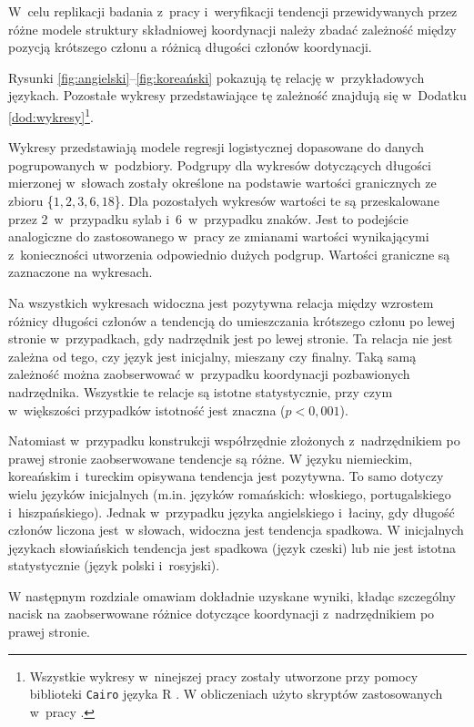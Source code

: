 W~celu replikacji badania z~pracy \cite{przepiorkowski2023conjunct} i~weryfikacji tendencji przewidywanych przez różne modele struktury składniowej koordynacji należy zbadać zależność między pozycją krótszego członu a różnicą długości członów koordynacji.

Rysunki \ref{fig:angielski}--\ref{fig:koreański} pokazują tę relację w~przykładowych językach. Pozostałe wykresy przedstawiające tę zależność znajdują się w~Dodatku \ref{dod:wykresy}\footnote{
Wszystkie wykresy w~ninejszej pracy zostały utworzone przy pomocy biblioteki \texttt{Cairo} języka R \citep{R2023}. W obliczeniach użyto skryptów zastosowanych w~pracy \cite{przepiorkowski2023conjunct}.}.

Wykresy przedstawiają modele regresji logistycznej dopasowane do danych pogrupowanych w~podzbiory. Podgrupy dla wykresów dotyczących długości mierzonej w~słowach zostały określone na podstawie wartości granicznych ze zbioru \{$1, 2, 3, 6, 18$\}. Dla pozostałych wykresów wartości te są przeskalowane przez 2~w~przypadku sylab i~6~w~przypadku znaków. Jest to podejście analogiczne do zastosowanego w~pracy \cite{przepiorkowski2023conjunct} ze zmianami wartości wynikającymi z~konieczności utworzenia odpowiednio dużych podgrup. Wartości graniczne są zaznaczone na wykresach. 

Na wszystkich wykresach widoczna jest pozytywna relacja między wzrostem różnicy długości członów a tendencją do umieszczania krótszego członu po lewej stronie w~przypadkach, gdy nadrzędnik jest po lewej stronie. Ta relacja nie jest zależna od tego, czy język jest inicjalny, mieszany czy finalny. Taką samą zależność można zaobserwować w~przypadku koordynacji pozbawionych nadrzędnika. Wszystkie te relacje są istotne statystycznie, przy czym w~większości przypadków istotność jest znaczna ($p<0{,}001$).

Natomiast w~przypadku konstrukcji współrzędnie złożonych z~nadrzędnikiem po prawej stronie zaobserwowane tendencje są różne. W języku niemieckim, koreańskim i~tureckim opisywana tendencja jest pozytywna. To samo dotyczy wielu języków inicjalnych (m.in. języków romańskich: włoskiego,  portugalskiego i~hiszpańskiego). Jednak w~przypadku języka angielskiego i~łaciny, gdy długość członów liczona jest~w słowach, widoczna jest tendencja spadkowa. W inicjalnych językach słowiańskich tendencja jest spadkowa (język czeski) lub nie jest istotna statystycznie (język polski i~rosyjski). 

W następnym rozdziale omawiam dokładnie uzyskane wyniki, kładąc szczególny nacisk na zaobserwowane różnice dotyczące koordynacji z~nadrzędnikiem po prawej stronie.

